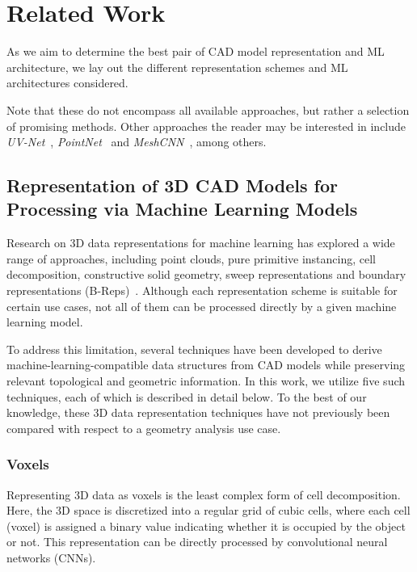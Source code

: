 \documentclass[5p,times,procedia]{elsarticle}
\begin{document}
\section{Related Work}\label{sec:Related-Work}
As we aim to determine the best pair of CAD model representation and ML architecture, we lay out the different representation schemes and ML architectures considered.

Note that these do not encompass all available approaches, but rather a selection of promising methods.
Other approaches the reader may be interested in include \textit{\mbox{UV-Net}}~\cite{jayaraman2021uv}, \textit{\mbox{PointNet}}~\cite{qi2016pointnet} and \textit{\mbox{MeshCNN}}~\cite{hanocka2019meshcnn}, among others.

\subsection{Representation of 3D CAD Models for Processing via Machine Learning Models}\label{sec:CAD-Representations}
Research on 3D data representations for machine learning has explored a wide range of approaches, including point clouds, pure primitive instancing, cell decomposition, constructive solid geometry, sweep representations and boundary representations (B-Reps)~\cite{requicha1980representations}.
Although each representation scheme is suitable for certain use cases, not all of them can be processed directly by a given machine learning model.

To address this limitation, several techniques have been developed to derive machine-learning-compatible data structures from CAD models while preserving relevant topological and geometric information.
In this work, we utilize five such techniques, each of which is described in detail below.
To the best of our knowledge, these 3D data representation techniques have not previously been compared with respect to a geometry analysis use case.

\subsubsection{Voxels}\label{sec:CAD-Representations-Voxels}
Representing 3D data as voxels is the least complex form of cell decomposition.
Here, the 3D space is discretized into a regular grid of cubic cells, where each cell (voxel) is assigned a binary value indicating whether it is occupied by the object or not.
This representation can be directly processed by convolutional neural networks (CNNs).
\end{document}
